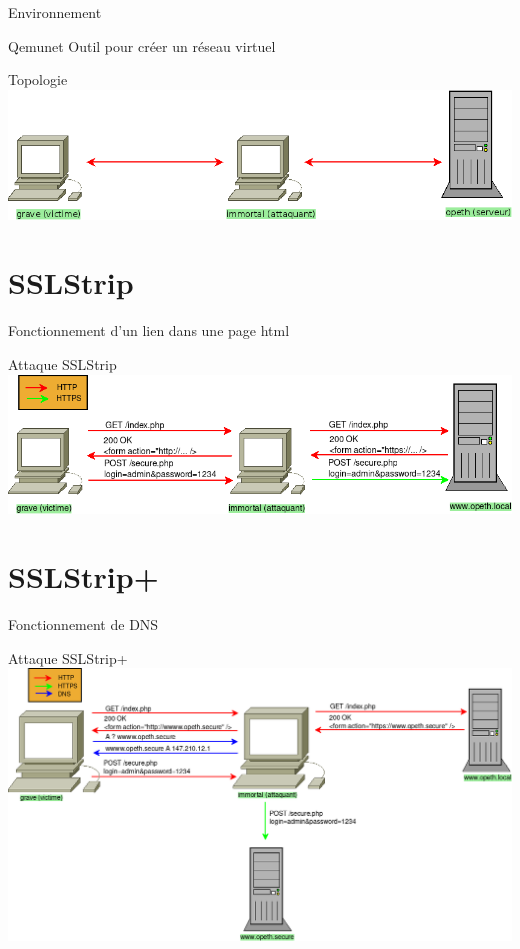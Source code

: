 \documentclass{bredelebeamer}
\begin{document}
\begin{frame}{Environnement}
    \begin{block}{Qemunet}
		Outil pour créer un réseau virtuel
    \end{block}
\end{frame}

\begin{frame}{Topologie}
    \includegraphics[width=\linewidth]{../medias/topology.png}
\end{frame}

\section{SSLStrip}

\begin{frame}{Fonctionnement d'un lien dans une page html}

\end{frame}

\begin{frame}{Attaque SSLStrip}
    \includegraphics[width=\linewidth]{../medias/sslstrip/attack.png}
\end{frame}

\section{SSLStrip+}

\begin{frame}{Fonctionnement de DNS}
\end{frame}

\begin{frame}{Attaque SSLStrip+}
    \includegraphics[width=\linewidth]{../medias/sslstrip2/attack.png}
\end{frame}
\end{document}
